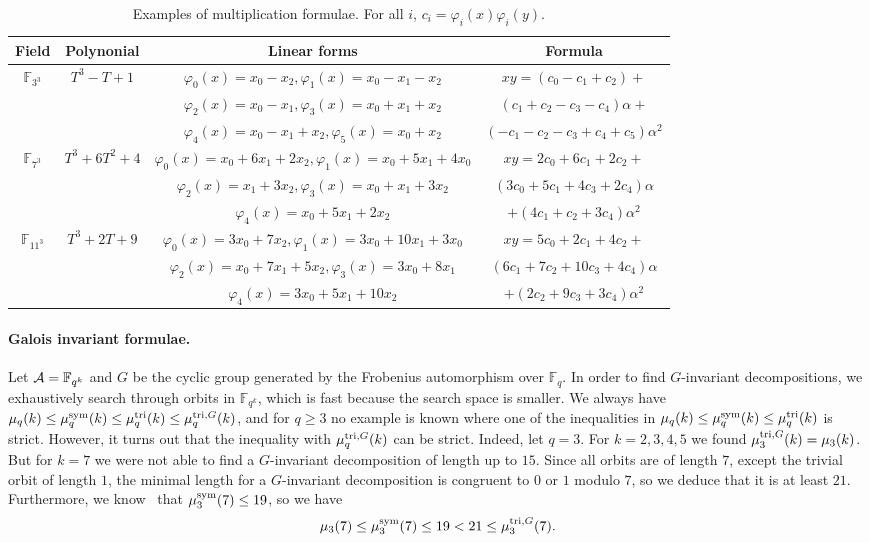 \documentclass[11pt]{article}
\begin{document}
\begin{table}
  \centering
  \footnotesize
  \begin{tabular}{|c|c|c|c|}
    \hline
    Field & Polynonial & Linear forms & Formula \\
    \hline
    \hline
    \multirow{3}{*}{$\mathbb{F}_{3^3}$} & \multirow{3}{*}{$T^3-T+1$} &
    $\varphi_0(x)=x_0-x_2,
    \varphi_1(x)=x_0-x_1-x_2$ & $xy = (c_0-c_1+c_2)+$ \\
    & & $\varphi_2(x)=x_0-x_1, \varphi_3(x)=x_0+x_1+x_2$ &
    $(c_1+c_2-c_3-c_4)\alpha+$\\
    & & $\varphi_4(x)=x_0-x_1+x_2, \varphi_5(x)=x_0+x_2$ &
    $(-c_1-c_2-c_3+c_4+c_5)\alpha^2$\\
    \hline
    \multirow{3}{*}{$\mathbb{F}_{7^3}$} & \multirow{3}{*}{$T^3+6T^2+4$} &
    $\varphi_0(x)=x_0+6x_1+2x_2,
    \varphi_1(x)=x_0+5x_1+4x_0$ &
    $xy=2c_0+6c_1+2c_2+$\\
    & & $\varphi_2(x)=x_1+3x_2, \varphi_3(x)=x_0+x_1+3x_2$ &
    $(3c_0+5c_1+4c_3+2c_4)\alpha$\\
    & & $\varphi_4(x)=x_0+5x_1+2x_2$ &
    $+(4c_1+c_2+3c_4)\alpha^2$ \\
    \hline
    \multirow{3}{*}{$\mathbb{F}_{11^3}$} & \multirow{3}{*}{$T^3+2T+9$} &
    $\varphi_0(x)=3x_0+7x_2,
    \varphi_1(x)=3x_0+10x_1+3x_0$ &
    $xy=5c_0+2c_1+4c_2+$\\
    & & $\varphi_2(x)=x_0+7x_1+5x_2, \varphi_3(x)=3x_0+8x_1$ &
    $(6c_1+7c_2+10c_3+4c_4)\alpha$\\
    & & $\varphi_4(x)=3x_0+5x_1+10x_2$ &
    $+(2c_2+9c_3+3c_4)\alpha^2$ \\
   \hline
  \end{tabular}
  \caption{Examples of multiplication formulae. For all $i$,
  $c_i=\varphi_i(x)\varphi_i(y)$. }
  \label{tab:formulae}
\end{table}

\paragraph{Galois invariant formulae.}
Let $\mathcal{A}=\mathbb{F}_{q^k}$ and $G$ be the cyclic group generated by the Frobenius
automorphism over $\mathbb{F}_{q}$. In order to find $G$-invariant decompositions,
we exhaustively search through orbits in $\mathbb{F}_{q^k}$, which is fast
because the search space is smaller.
We always have $\mu_q(k)\leq\mu^{\textrm{sym}}_q(k)\leq\mu^{\textrm{tri}}_q(k)\leq\mu^{\textrm{tri},G}_q(k)$,
and for $q\geq3$ no example is known where one of the inequalities in $\mu_q(k)\leq\mu^{\textrm{sym}}_q(k)\leq\mu^{\textrm{tri}}_q(k)$
is strict. However, it turns out that the inequality with $\mu^{\textrm{tri},G}_q(k)$ can be strict.
Indeed, let $q=3$. For $k=2,3,4,5$ we found $\mu^{\textrm{tri},G}_3(k)=\mu_3(k)$. But for $k=7$ we were not able to
find a $G$-invariant decomposition of length up to $15$. Since all orbits are of length $7$, 
except the trivial orbit of length $1$, the minimal length for a $G$-invariant decomposition is
congruent to $0$ or $1$ modulo $7$, so we deduce that it is
at least $21$. Furthermore, we know~\cite[table~2]{BCPRRR19} that $\mu^{\textrm{sym}}_3(7)\leq19$, so we have
\[ \mu_3(7)\leq\mu^{\textrm{sym}}_3(7)\leq 19<21\leq \mu^{\textrm{tri},G}_3(7). \]
\end{document}
